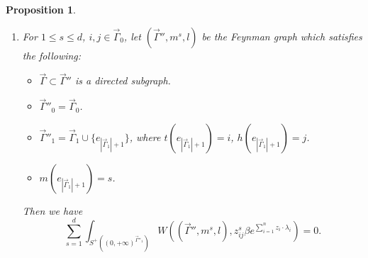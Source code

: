 \documentclass[11pt]{amsart}
\newtheorem{prop}[thm]{Proposition}
\theoremstyle{definition}
\theoremstyle{remark}
\numberwithin{equation}{section}
\begin{document}
\begin{prop}
\begin{enumerate}
\begin{align}
        \int_{S^{+}((0,+\infty)^{\vec{\Gamma}_{1}})}W((\vec{\Gamma},m,l),\beta e^{\sum_{i=1}^{n}z_{i}\cdot\lambda_{i}}).    
        \end{align}
        \item For $1\leq s\leq d$, $i,j\in \vec{\Gamma}_{0}$, let $(\vec{\Gamma}'',m^{s},l)$ be the Feynman graph which satisfies the following:
        \begin{itemize}
            \item $\vec{\Gamma}\subset\vec{\Gamma}''$ is a directed subgraph.
            \item $\vec{\Gamma}''_{0}=\vec{\Gamma}_{0}$.
            \item $\vec{\Gamma}''_{1}=\vec{\Gamma}_{1}\cup\{e_{|\vec{\Gamma}_{1}|+1}\}$, where $t(e_{|\vec{\Gamma}_{1}|+1})=i$, $h(e_{|\vec{\Gamma}_{1}|+1})=j$.
            \item $m(e_{|\vec{\Gamma}_{1}|+1})=s$.
        \end{itemize}
        Then we have
        $$
        \sum_{s=1}^{d}\int_{S^{+}((0,+\infty)^{\vec{\Gamma}''_{1}})}W((\vec{\Gamma}'',m^{s},l),z_{ij}^{s}\beta e^{\sum_{i=1}^{n}z_{i}\cdot\lambda_{i}})=0.
        $$
    \end{enumerate}
\end{prop}
\end{document}

